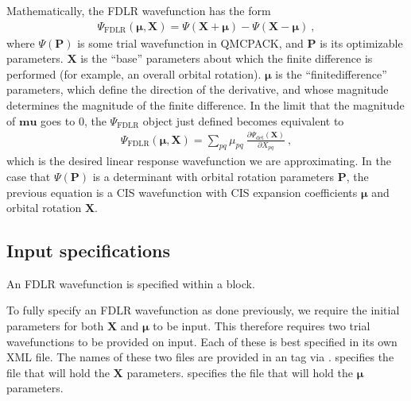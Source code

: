 \documentclass[letterpaper,10pt,english]{sphinxmanual}
\begin{document}
Mathematically, the FDLR wavefunction has the form
\begin{equation}\label{equation:intro_wavefunction:eq25}
\begin{split}\Psi_{\textrm{FDLR}} (\mathbf{\mu}, \mathbf{X}) = \Psi (\mathbf{X} + \mathbf{\mu}) - \Psi (\mathbf{X} - \mathbf{\mu})\: ,\end{split}
\end{equation}
where \(\Psi(\mathbf{P})\) is some trial wavefunction in QMCPACK,
and \(\mathbf{P}\) is its optimizable parameters. \(\mathbf{X}\)
is the “base” parameters about which the finite difference is performed
(for example, an overall orbital rotation). \(\mathbf{\mu}\) is the
“finite\sphinxhyphen{}difference” parameters, which define the direction of the
derivative, and whose magnitude determines the magnitude of the finite
difference. In the limit that the magnitude of \(\mathbf{mu}\) goes
to \(0\), the \(\Psi_{\textrm{FDLR}}\) object just defined
becomes equivalent to
\begin{equation}\label{equation:intro_wavefunction:eq26}
\begin{split}\Psi_{\textrm{FDLR}} (\mathbf{\mu}, \mathbf{X}) = \sum_{pq} \mu_{pq} \: \frac{\partial \Psi_{\textrm{det}} (\mathbf{X}) }{\partial X_{pq}}\: ,\end{split}
\end{equation}
which is the desired linear response wavefunction we are approximating.
In the case that \(\Psi(\mathbf{P})\) is a determinant with orbital
rotation parameters \(\mathbf{P}\), the previous equation is a CIS
wavefunction with CIS expansion coefficients \(\mathbf{\mu}\) and
orbital rotation \(\mathbf{X}\).


\subsection{Input specifications}
\label{\detokenize{intro_wavefunction:id26}}
An FDLR wavefunction is specified within a  block.

To fully specify an FDLR wavefunction as done previously, we require the
initial parameters for both \(\mathbf{X}\) and \(\mathbf{\mu}\)
to be input. This therefore requires two trial wavefunctions to be
provided on input. Each of these is best specified in its own XML file.
The names of these two files are provided in an  tag via
. 
specifies the file that will hold the \(\mathbf{X}\) parameters.
 specifies the file that will hold the
\(\mathbf{\mu}\) parameters.
\end{document}
